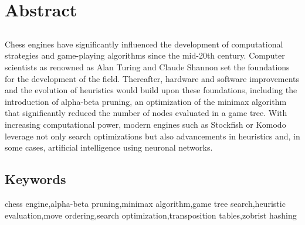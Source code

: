 \chapter*{Abstract}

\section*{\tituloPortadaVal}

Chess engines have significantly influenced the development of computational strategies and game-playing algorithms since the mid-20th century. Computer scientists as renowned as Alan Turing and Claude Shannon set the foundations for the development of the field. Thereafter, hardware and software improvements and the evolution of heuristics would build upon these foundations, including the introduction of alpha-beta pruning, an optimization of the minimax algorithm that significantly reduced the number of nodes evaluated in a game tree. With increasing computational power, modern engines such as Stockfish or Komodo leverage not only search optimizations but also advancements in heuristics and, in some cases, artificial intelligence using neuronal networks.

\section*{Keywords}

\noindent chess engine,alpha-beta pruning,minimax algorithm,game tree search,heuristic evaluation,move ordering,search optimization,transposition tables,zobrist hashing
